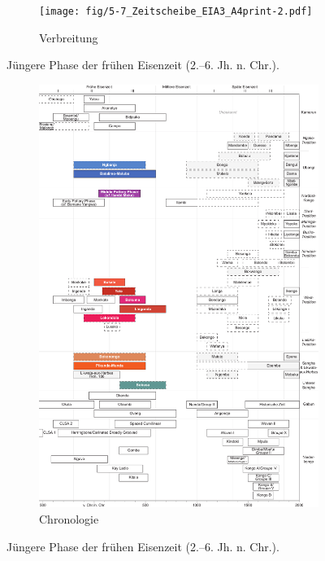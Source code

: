 \begin{figure}[p]
	\centering
	\begin{subfigure}[b]{\textwidth}
		\centering
		\texttt{[image: fig/5-7\_Zeitscheibe\_EIA3\_A4print-2.pdf]}
		\vspace{4cm}
		\caption{Verbreitung}
		\label{fig:EIA3_Karte}
	\end{subfigure}
	\caption{Jüngere Phase der frühen Eisenzeit (2.--6. Jh. n. Chr.).}
	\label{}
\end{figure}
\addtocounter{figure}{-1}
\begin{figure}[p]
	\begin{subfigure}[b]{\textwidth}
		\setcounter{subfigure}{1}
		\centering
		\includegraphics[height = .9\textheight]{fig/Chronologiesystem_v4_Zeitscheibe_EIA3.pdf}
		\caption{Chronologie}
		\label{fig:EIA3_Chronologie}
	\end{subfigure}
	\caption{Jüngere Phase der frühen Eisenzeit (2.--6. Jh. n. Chr.).}
	\label{fig:EIA3}
\end{figure}

